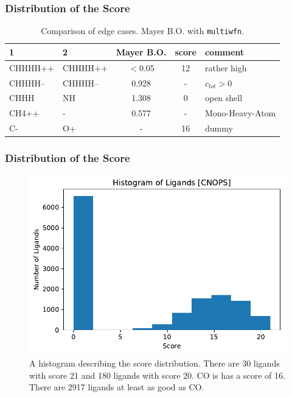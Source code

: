 \documentclass{beamer}
\begin{document}

\begin{frame}
\frametitle{Distribution of the Score}

\begin{table}\centering
	\caption{Comparison of edge cases. Mayer B.O. with \texttt{multiwfn}.}
{
		\begin{tabular}{llccl}
			\toprule
			1         & 2       & Mayer B.O. & score & comment  \\
			\midrule
			CHHHH++ & CHHHH++&	$<$0.05 &12 & rather high  \\
			CHHHH-- & CHHHH--&	0.928 &-  & $c_{tot} > 0$  \\
			CHHH    & NH     &	1.308&0  & open shell  \\
			CH4++   & -        &	0.577&-  & Mono-Heavy-Atom\\
			C-      &O+     &	-    &16 & dummy \\
			\bottomrule
		\end{tabular}
	}
	
\end{table}

\end{frame}


\begin{frame}
\frametitle{Distribution of the Score}
\begin{figure}
\includegraphics[width=0.7\linewidth]{img/distr_CNOPS.pdf}
\caption{A histogram describing the score distribution. There are 30 ligands with score 21 and 180 ligands with score 20. CO is has a score of 16. There are 2917 ligands at least as good as CO.} 
\end{figure}
\end{frame}

\end{document}
